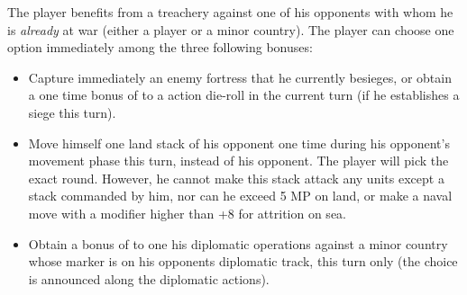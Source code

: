 
The player benefits from a treachery against one of his opponents with whom he
is \emph{already} at war (either a player or a minor country). The player can
choose one option immediately among the three following bonuses:
\begin{itemize}
\item Capture immediately an enemy fortress that he currently besieges, or
  obtain a one time bonus of  to a  action
  die-roll in the current turn (if he establishes a siege this turn).
\item Move himself one land stack of his opponent one time during his
  opponent's movement phase this turn, instead of his opponent. The player
  will pick the exact round. However, he cannot make this stack attack any
  units except a stack commanded by him, nor can he exceed 5 MP on land, or
  make a naval move with a modifier higher than +8 for attrition on sea.
\item Obtain a bonus of  to one his diplomatic operations against a
  minor country whose marker is on his opponents diplomatic track, this turn
  only (the choice is announced along the diplomatic actions).
\end{itemize}


\stopevents


